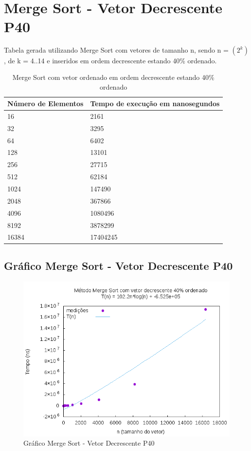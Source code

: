 \documentclass[12pt,a4paper,twoside]{report}
\begin{document}
\section{Merge Sort - Vetor Decrescente P40}
Tabela gerada utilizando Merge Sort com vetores de tamanho n, sendo n = $(2^k)$, de k = 4..14 e inseridos em ordem decrescente estando 40\% ordenado.
\begin{table}[H]
\centering
\caption{Merge Sort com vetor ordenado em ordem decrescente estando 40\% ordenado}
\label{my-label}
\begin{tabular}{|l|l|}
\hline
\multicolumn{1}{|c|}{\textbf{Número de Elementos}} & \multicolumn{1}{c|}{\textbf{Tempo de execução em nanosegundos}} \\ \hline
16 & 2161 \\ \hline
32 & 3295 \\ \hline
64 & 6402 \\ \hline
128 & 13101 \\ \hline
256 & 27715 \\ \hline
512 & 62184 \\ \hline
1024 & 147490 \\ \hline
2048 & 367866 \\ \hline
4096 & 1080496 \\ \hline
8192 & 3878299 \\ \hline
16384 & 17404245 \\ \hline
\end{tabular}
\end{table}

\subsection{Gráfico Merge Sort - Vetor Decrescente P40}
\begin{figure}[H]
    \centering
    \includegraphics[width=0.7\linewidth]{graficos/MergeSort/vIntDecrescenteP40/vIntDecrescenteP40.png}
  \caption{Gráfico Merge Sort - Vetor Decrescente P40}
\end{figure}
\end{document}
